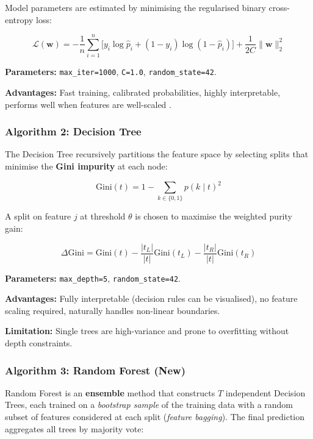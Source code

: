 \documentclass[12pt, a4paper]{article}
\begin{document}
Model parameters are estimated by minimising the regularised binary
cross-entropy loss:

\begin{equation}
    \mathcal{L}(\mathbf{w}) = -\frac{1}{n}\sum_{i=1}^{n}
    \Big[y_i \log \hat{p}_i + (1-y_i)\log(1-\hat{p}_i)\Big]
    + \frac{1}{2C}\|\mathbf{w}\|^2_2
\end{equation}

\noindent\textbf{Parameters:} \texttt{max\_iter=1000}, \texttt{C=1.0},
\texttt{random\_state=42}.

\textbf{Advantages:} Fast training, calibrated probabilities, highly interpretable,
performs well when features are well-scaled \cite{bishop2006}.

\subsubsection{Algorithm 2: Decision Tree}

The Decision Tree recursively partitions the feature space by selecting
splits that minimise the \textbf{Gini impurity} at each node:

\begin{equation}
    \text{Gini}(t) = 1 - \sum_{k \in \{0,1\}} p(k \mid t)^2
\end{equation}

A split on feature $j$ at threshold $\theta$ is chosen to maximise the
weighted purity gain:

\begin{equation}
    \Delta\text{Gini} = \text{Gini}(t)
    - \frac{|t_L|}{|t|}\text{Gini}(t_L)
    - \frac{|t_R|}{|t|}\text{Gini}(t_R)
\end{equation}

\noindent\textbf{Parameters:} \texttt{max\_depth=5}, \texttt{random\_state=42}.

\textbf{Advantages:} Fully interpretable (decision rules can be visualised),
no feature scaling required, naturally handles non-linear boundaries.

\textbf{Limitation:} Single trees are high-variance and prone to overfitting
without depth constraints.

\subsubsection{Algorithm 3: Random Forest (New)}

Random Forest \cite{breiman2001} is an \textbf{ensemble} method that
constructs $T$ independent Decision Trees, each trained on a
\textit{bootstrap sample} of the training data with a random
subset of features considered at each split (\textit{feature bagging}).
The final prediction aggregates all trees by majority vote:
\end{document}

